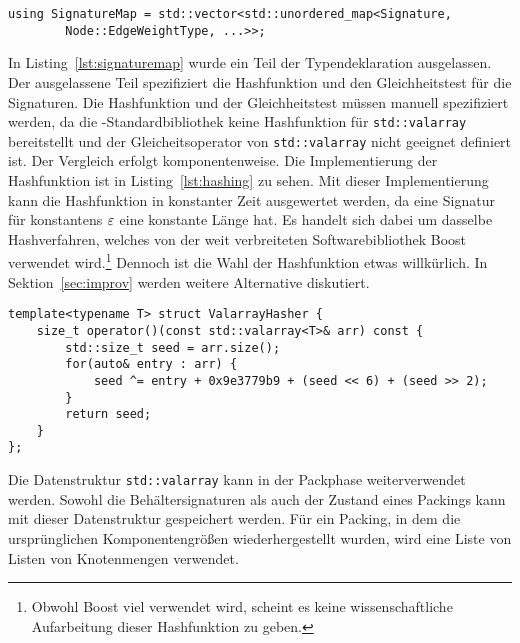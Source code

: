 \begin{lstlisting}[caption={Definition von \texttt{SignatureMap}}, label={lst:signaturemap}]
    using SignatureMap = std::vector<std::unordered_map<Signature, 
        Node::EdgeWeightType, ...>>;
\end{lstlisting}

In Listing~\ref{lst:signaturemap} wurde ein Teil der Typendeklaration ausgelassen.
Der ausgelassene Teil spezifiziert die Hashfunktion und den Gleichheitstest für die Signaturen.
Die Hashfunktion und der Gleichheitstest müssen manuell spezifiziert werden, da die \Cpp{}\hyp Standardbibliothek keine Hashfunktion für \texttt{std::valarray} bereitstellt und der Gleicheitsoperator von \texttt{std::valarray} nicht geeignet definiert ist.
Der Vergleich erfolgt komponentenweise.
Die Implementierung der Hashfunktion ist in Listing~\ref{lst:hashing} zu sehen.
Mit dieser Implementierung kann die Hashfunktion in konstanter Zeit ausgewertet werden, da eine Signatur für konstantens $\varepsilon$ eine konstante Länge hat.
Es handelt sich dabei um dasselbe Hashverfahren, welches von der weit verbreiteten Softwarebibliothek Boost~\cite{BOOST} verwendet wird.\footnote{Obwohl Boost viel verwendet wird, scheint es keine wissenschaftliche Aufarbeitung dieser Hashfunktion zu geben.}
Dennoch ist die Wahl der Hashfunktion etwas willkürlich.
In Sektion~\ref{sec:improv} werden weitere Alternative diskutiert.

\begin{lstlisting}[float, floatplacement=h, caption={Hashing mit \texttt{ValarrayHasher}}, label={lst:hashing}]
template<typename T> struct ValarrayHasher {
    size_t operator()(const std::valarray<T>& arr) const {
		std::size_t seed = arr.size();
		for(auto& entry : arr) {
			seed ^= entry + 0x9e3779b9 + (seed << 6) + (seed >> 2);
		}
		return seed;
	}
};
\end{lstlisting}

Die Datenstruktur \texttt{std::valarray} kann in der Packphase weiterverwendet werden.
Sowohl die Behältersignaturen als auch der Zustand eines Packings kann mit dieser Datenstruktur gespeichert werden.
Für ein Packing, in dem die ursprünglichen Komponentengrößen wiederhergestellt wurden, wird eine Liste von Listen von Knotenmengen verwendet.

